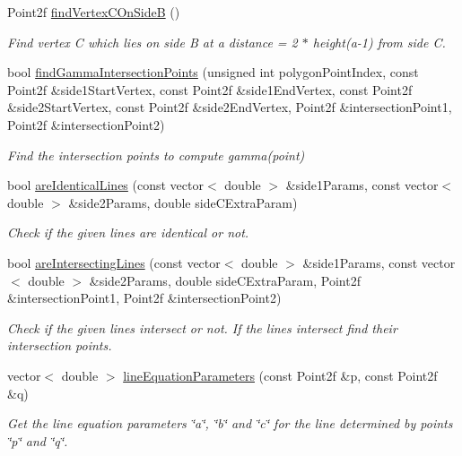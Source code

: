 \begin{DoxyCompactItemize}
\-Point2f \hyperlink{classmultiscale_1_1MinEnclosingTriangleFinder_ab0b488d2d67f2d22077777eebc292c1a}{find\-Vertex\-C\-On\-Side\-B} ()
\begin{DoxyCompactList}\small\item\em \-Find vertex \-C which lies on side \-B at a distance = 2 $\ast$ height(a-\/1) from side \-C. \end{DoxyCompactList}\item 
bool \hyperlink{classmultiscale_1_1MinEnclosingTriangleFinder_a9eedc43ea3190d8ee6343879dc100edb}{find\-Gamma\-Intersection\-Points} (unsigned int polygon\-Point\-Index, const \-Point2f \&side1\-Start\-Vertex, const \-Point2f \&side1\-End\-Vertex, const \-Point2f \&side2\-Start\-Vertex, const \-Point2f \&side2\-End\-Vertex, \-Point2f \&intersection\-Point1, \-Point2f \&intersection\-Point2)
\begin{DoxyCompactList}\small\item\em \-Find the intersection points to compute gamma(point) \end{DoxyCompactList}\item 
bool \hyperlink{classmultiscale_1_1MinEnclosingTriangleFinder_a65a15d407aeab7f9b81fe527c9a53e81}{are\-Identical\-Lines} (const vector$<$ double $>$ \&side1\-Params, const vector$<$ double $>$ \&side2\-Params, double side\-C\-Extra\-Param)
\begin{DoxyCompactList}\small\item\em \-Check if the given lines are identical or not. \end{DoxyCompactList}\item 
bool \hyperlink{classmultiscale_1_1MinEnclosingTriangleFinder_a890d17359c3cdf30b6c20b08cd12b6c9}{are\-Intersecting\-Lines} (const vector$<$ double $>$ \&side1\-Params, const vector$<$ double $>$ \&side2\-Params, double side\-C\-Extra\-Param, \-Point2f \&intersection\-Point1, \-Point2f \&intersection\-Point2)
\begin{DoxyCompactList}\small\item\em \-Check if the given lines intersect or not. \-If the lines intersect find their intersection points. \end{DoxyCompactList}\item 
vector$<$ double $>$ \hyperlink{classmultiscale_1_1MinEnclosingTriangleFinder_ab2aa08fbf3d17d25f55eb21cd2524975}{line\-Equation\-Parameters} (const \-Point2f \&p, const \-Point2f \&q)
\begin{DoxyCompactList}\small\item\em \-Get the line equation parameters \char`\"{}a\char`\"{}, \char`\"{}b\char`\"{} and \char`\"{}c\char`\"{} for the line determined by points \char`\"{}p\char`\"{} and \char`\"{}q\char`\"{}. \end{DoxyCompactList}\item 

\end{DoxyCompactItemize}
